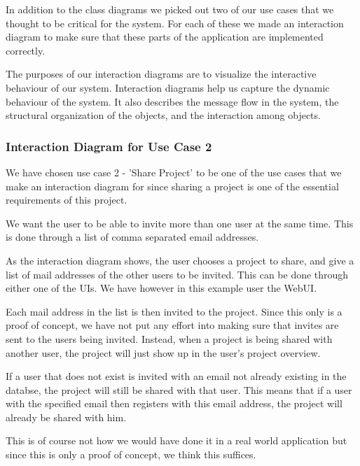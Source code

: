 In addition to the class diagrams we picked out two of our use cases that we thought to be critical for the system. For each of these we made an interaction diagram
to make sure that these parts of the application are implemented correctly. 

The purposes of our interaction diagrams are to visualize the interactive behaviour of our system. Interaction diagrams help us capture the dynamic behaviour of 
the system. It also describes the message flow in the system, the structural organization of the objects, and the interaction among objects.

\subsubsection{Interaction Diagram for Use Case 2}

We have chosen use case 2 - 'Share Project' to be one of the use cases that we make an interaction diagram for since sharing a project is one of the essential
requirements of this project. 

We want the user to be able to invite more than one user at the same time. This is done through a list of comma separated email addresses. 


As the interaction diagram shows, the user chooses a project to share, and give a list of mail addresses of the other users to be invited. This can be done through
either one of the UIs. We have however in this example user the WebUI. 

Each mail address in the list is then invited to the project. Since this only is a proof of concept, we have not put any effort into making sure that invites 
are sent to the users being invited. Instead, when a project is being shared with another user, the project will just show up in the user's project overview.

If a user that does not exist is invited with an email not already existing in the databse, the project will still be shared with that user. 
This means that if a user with the specified email then registers with this email address, the project will already be shared with him. 

This is of course not how we would have done it in a real world application but since this is only a proof of concept, we think this suffices. 
